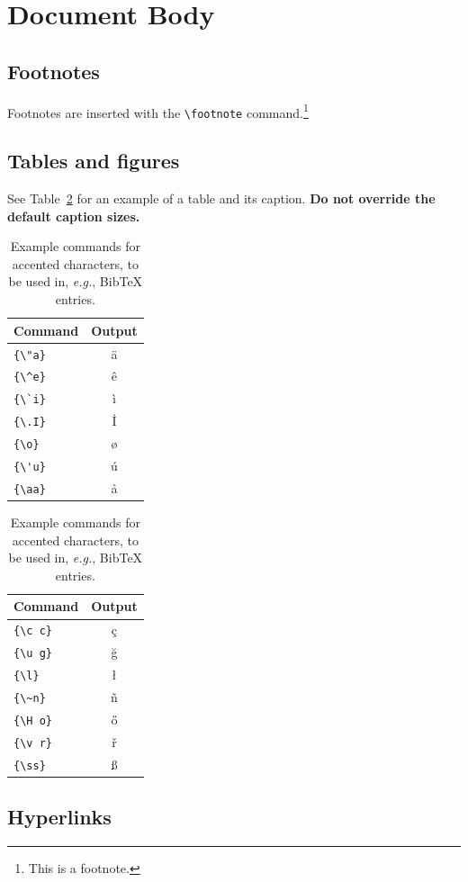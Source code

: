 \documentclass[11pt]{article}
\begin{document}
\section{Document Body}

\subsection{Footnotes}

Footnotes are inserted with the \verb|\footnote| command.\footnote{This is a footnote.}

\subsection{Tables and figures}

See Table~\ref{tab:accents} for an example of a table and its caption.
\textbf{Do not override the default caption sizes.}

\begin{table}
\centering
\begin{tabular}{lc}
\hline
\textbf{Command} & \textbf{Output}\\
\hline
\verb|{\"a}| & {\"a} \\
\verb|{\^e}| & {\^e} \\
\verb|{\`i}| & {\`i} \\
\verb|{\.I}| & {\.I} \\
\verb|{\o}| & {\o} \\
\verb|{\'u}| & {\'u}  \\
\verb|{\aa}| & {\aa}  \\\hline
\end{tabular}
\begin{tabular}{lc}
\hline
\textbf{Command} & \textbf{Output}\\
\hline
\verb|{\c c}| & {\c c} \\
\verb|{\u g}| & {\u g} \\
\verb|{\l}| & {\l} \\
\verb|{\~n}| & {\~n} \\
\verb|{\H o}| & {\H o} \\
\verb|{\v r}| & {\v r} \\
\verb|{\ss}| & {\ss} \\
\hline
\end{tabular}
\caption{Example commands for accented characters, to be used in, \emph{e.g.}, Bib\TeX{} entries.}
\label{tab:accents}
\end{table}

\subsection{Hyperlinks}
\end{document}
